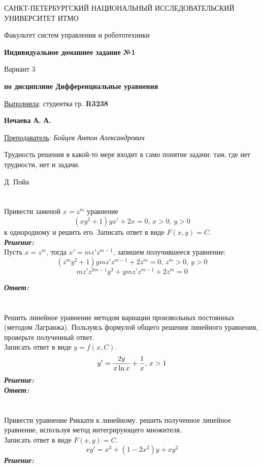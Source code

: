 \documentclass[a5paper, 10pt]{article}
\theoremstyle{definition}
\theoremstyle{plain}
\theoremstyle{remark}
\newcommand*{\titlePage}{
	\thispagestyle{title}
	\begingroup
	\begin{center}
		\vspace*{6ex}
		
		{\small
			САНКТ-ПЕТЕРБУРГСКИЙ НАЦИОНАЛЬНЫЙ ИССЛЕДОВАТЕЛЬСКИЙ УНИВЕРСИТЕТ ИТМО	
		}
		
		\vspace*{2ex}
		
		{\normalsize
			Факультет систем управления и робототехники
		}
		
		\vspace*{15ex}
		
		{\Large \bfseries 
			Индивидуальное домашнее задание №1
		}
\vspace*{3ex}
		
		{ \Large 
			Вариант 3
		}
\vspace*{3ex}
		
		{  \bfseries 
			по дисциплине Дифференциальные уравнения
		}
	\end{center}
	\vspace*{20ex}
	\begin{flushright}
		{\large 
			\underline{Выполнила}: студентка гр. \textbf{R3238}\\
			\begin{flushright}
				\textbf{Нечаева А. А.}\\
			\end{flushright}
		}
		
		\vspace*{5ex}
		
		{\large 
			\underline{Преподаватель}: \textit{Бойцев Антон Александрович}
		}
	\end{flushright}	
	\newpage
	\setcounter{page}{1}
	\endgroup}
\begin{document}
	\titlePage
	\pagestyle{style}
	
\newpage
\epigraph{Трудность решения в какой-то мере входит в само понятие задачи: там, где нет трудности, нет и задачи.}{Д. Пойа}

\section{}
Привести заменой $x=z^m$ уравнение 
\begin{equation*}
(xy^2+1)yx' + 2x = 0, \, x > 0, \, y > 0
\end{equation*}
к однородному и решить его. Записать ответ в виде $F(x, y) = C$.\\
\textit{\textbf{Решение:}}\\
Пусть $x=z^m$, тогда $x'=mz'z^{m-1}$, запишем получившееся уравнение:
\begin{equation*}
(z^my^2+1)ymz'z^{m-1} + 2z^m = 0, \, z^m > 0, \, y > 0
\end{equation*}
\begin{equation*}
mz'z^{2m-1}y^3+ymz'z^{m-1} + 2z^m = 0
\end{equation*}

\textit{\textbf{Ответ:}}

\newpage
\section{}
Решить линейное уравнение методом вариации произвольных постоянных (методом Лагранжа). Пользуясь формулой общего решения линейного уравнения, проверьте полученный ответ.\\
Записать ответ в виде $y = f(x, C).$
\begin{equation*}
y' = \frac{2y}{x \ln x} + \frac{1}{x}, \, x > 1\\
\end{equation*}
\textit{\textbf{Решение:}}\\


\textit{\textbf{Ответ:}}

\newpage
\section{}
Привести уравнение Риккати к линейному. решить полученное линейное уравнение, используя метод интегрирующего множителя.\\
Записать ответ в виде $F(x, y) = C$.
\begin{equation*}
xy' = x^3 + (1 - 2x^2)y + xy^2
\end{equation*}
\textit{\textbf{Решение:}}\\
\end{document}
